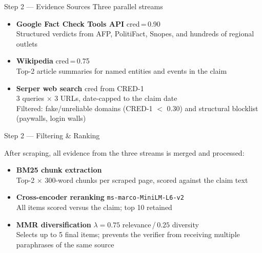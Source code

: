 \documentclass[11pt, aspectratio=169]{beamer}
\begin{document}
\begin{frame}{Step 2 — Evidence Sources \hfill \normalsize\textcolor{slate}{Three parallel streams}}

  \begin{itemize}\setlength{\itemsep}{16pt}
    \item \textbf{\textcolor{forestg}{Google Fact Check Tools API}} \hfill cred\,=\,0.90\\
          Structured verdicts from AFP, PolitiFact, Snopes, and hundreds of regional outlets
    \item \textbf{Wikipedia} \hfill cred\,=\,0.75\\
          Top-2 article summaries for named entities and events in the claim
    \item \textbf{Serper web search} \hfill cred from CRED-1\\
          3 queries $\times$ 3 URLs, date-capped to the claim date\\
          Filtered: fake/unreliable domains (CRED-1 $<$ 0.30) and structural blocklist (paywalls, login walls)
  \end{itemize}
\end{frame}

\begin{frame}{Step 2 — Filtering \& Ranking}

  After scraping, all evidence from the three streams is merged and processed:

  \bigskip
  \begin{itemize}\setlength{\itemsep}{16pt}
    \item \textbf{BM25 chunk extraction}\\
          Top-2 $\times$ 300-word chunks per scraped page, scored against the claim text
    \item \textbf{Cross-encoder reranking} \hfill \texttt{ms-marco-MiniLM-L6-v2}\\
          All items scored versus the claim; top 10 retained
    \item \textbf{MMR diversification} \hfill $\lambda = 0.75$ relevance\,/\,$0.25$ diversity\\
          Selects up to 5 final items; prevents the verifier from receiving
          multiple paraphrases of the same source
  \end{itemize}
\end{frame}
\end{document}
